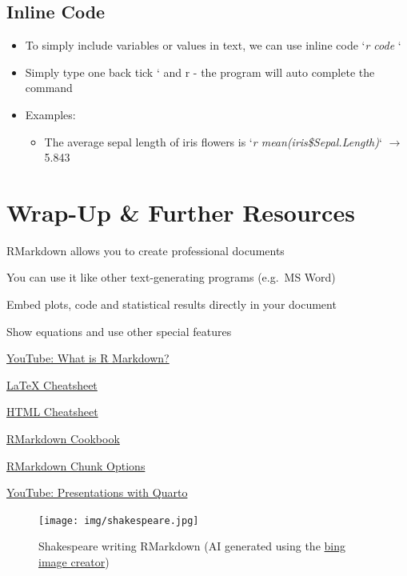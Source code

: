 \documentclass[
]{book}
\providecommand{\tightlist}{%
  \setlength{\itemsep}{0pt}\setlength{\parskip}{0pt}}
\begin{document}
\subsection{Inline Code}\label{inline-code}

\begin{itemize}
\tightlist
\item
  To simply include variables or values in text, we can use inline code `\emph{r code} `
\item
  Simply type one back tick ` and r - the program will auto complete the command
\item
  Examples:

  \begin{itemize}
  \tightlist
  \item
    The average sepal length of iris flowers is
    `\emph{r mean(iris\$Sepal.Length)}` \(\rightarrow\) 5.843
  \end{itemize}
\end{itemize}

\section*{Wrap-Up \& Further Resources}\label{wrap-up-further-resources-8}

RMarkdown allows you to create professional documents

You can use it like other text-generating programs (e.g.~MS Word)

Embed plots, code and statistical results directly in your document

Show equations and use other special features

\href{https://www.youtube.com/watch?v=asHhuHRxhvo&ab_channel=EquitableEquations/}{YouTube: What is R Markdown?}

\href{https://wch.github.io/latexsheet/}{LaTeX Cheatsheet}

\href{https://web.stanford.edu/group/csp/cs21/htmlcheatsheet.pdf}{HTML Cheatsheet}

\href{https://bookdown.org/yihui/rmarkdown-cookbook/}{RMarkdown Cookbook}

\href{https://yihui.org/knitr/options/}{RMarkdown Chunk Options}

\href{https://www.youtube.com/watch?v=01KifhHDkFk&ab_channel=EquitableEquations}{YouTube: Presentations with Quarto}

\begin{figure}
\centering
\texttt{[image: img/shakespeare.jpg]}
\caption{Shakespeare writing RMarkdown (AI generated using the \href{https://www.bing.com/images/create}{bing image creator})}
\end{figure}
\end{document}
